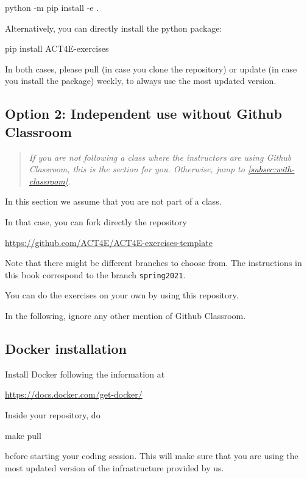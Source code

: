 \begin{console}
    python -m pip install -e .
\end{console}

Alternatively, you can directly install the python package:

\begin{console}
    pip install ACT4E-exercises
\end{console}

In both cases, please pull (in case you clone the repository) or update (in case you install the package) weekly, to always use the most updated version.

\subsection{Option 2: Independent use without Github Classroom}
\label{sub:without-classroom}

\begin{quote}
    \emph{
        If you are \emph{not} following a class where the instructors are using Github Classroom,
        this is the section for you.
        Otherwise, jump to \cref{subsec:with-classroom}.
    }
\end{quote}

In this section we assume that you are not part of a class.

In that case, you can fork directly the repository

\url{https://github.com/ACT4E/ACT4E-exercises-template}

Note that there might be different branches to choose from.
The instructions in this book correspond to the branch \texttt{spring2021}.

You can do the exercises on your own by using this repository.

In the following, ignore any other mention of Github Classroom.

\subsection{Docker installation}

Install Docker following the information at

\url{https://docs.docker.com/get-docker/}

Inside your repository, do

\begin{console}
    make pull
\end{console}

before starting your coding session.
This will make sure that you are using the most updated version of the infrastructure provided by us.

